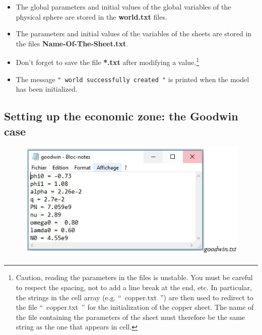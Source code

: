 \documentclass[12pt,a4paper]{article}%
\begin{document}
\begin{itemize}
	\item The global parameters and initial values of the global variables of the physical sphere are stored in the \textbf{world.txt} files.
	
	\item The parameters and initial values of the variables of the sheets are stored in the files \textbf{Name-Of-The-Sheet.txt}.
	
	\item Don't forget to save the file \textbf{*.txt} after modifying a value.\footnote{Caution, reading the parameters in the files is {unstable}. You must be careful to respect the spacing, not to add a line break at the end, etc. In particular, the strings in the cell array (e.g. ``~copper.txt~'') are then used to redirect to the file ``~copper.txt~'' for the initialization of the copper sheet. The name of the file containing the parameters of the sheet must therefore be the same string as the one that appears in cell.}
	
	\item The message \texttt{"~world successfully created~"} is printed when the model has been initialized.
\end{itemize}


\subsection{Setting up the economic zone: the Goodwin case}

\begin{figure}[h]
	\centering
	\includegraphics[width=1.0\textwidth]{figures/Goodwin-txt.jpg}
\end{figure}
\end{document}
